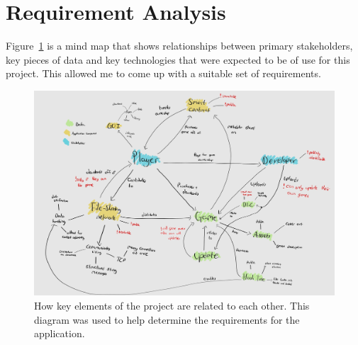 \section{Requirement Analysis}\label{app:req-analysis}

Figure~\ref{fig:req-generator} is a mind map that shows relationships between primary stakeholders, key pieces of data and key technologies that were expected to be of use for this project. This allowed me to come up with a suitable set of requirements.

\begin{figure}[ht]
  \centering
  \includegraphics[width=.9\textwidth]{assets/images/diagrams/requirement-generation.jpg}
  \caption{How key elements of the project are related to each other. This diagram was used to help determine the requirements for the application.}
  \label{fig:req-generator}
\end{figure}
